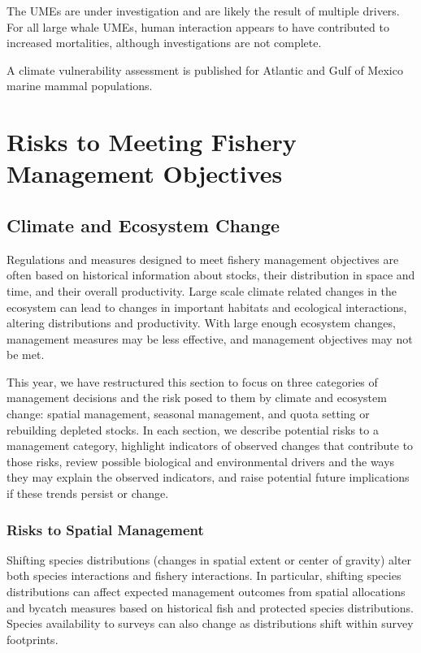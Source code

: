 \documentclass[
  10pt,
]{article}
\begin{document}
The UMEs are under investigation and are likely the result of multiple drivers. For all large whale UMEs, human interaction appears to have contributed to increased mortalities, although investigations are not complete.

A climate vulnerability assessment is published for Atlantic and Gulf of Mexico marine mammal populations.

\hypertarget{risks-to-meeting-fishery-management-objectives}{%
\section{Risks to Meeting Fishery Management Objectives}\label{risks-to-meeting-fishery-management-objectives}}

\hypertarget{climate-and-ecosystem-change}{%
\subsection{Climate and Ecosystem Change}\label{climate-and-ecosystem-change}}

Regulations and measures designed to meet fishery management objectives are often based on historical information about stocks, their distribution in space and time, and their overall productivity. Large scale climate related changes in the ecosystem can lead to changes in important habitats and ecological interactions, altering distributions and productivity. With large enough ecosystem changes, management measures may be less effective, and management objectives may not be met.

This year, we have restructured this section to focus on three categories of management decisions and the risk posed to them by climate and ecosystem change: spatial management, seasonal management, and quota setting or rebuilding depleted stocks. In each section, we describe potential risks to a management category, highlight indicators of observed changes that contribute to those risks, review possible biological and environmental drivers and the ways they may explain the observed indicators, and raise potential future implications if these trends persist or change.

\hypertarget{risks-to-spatial-management}{%
\subsubsection{Risks to Spatial Management}\label{risks-to-spatial-management}}

Shifting species distributions (changes in spatial extent or center of gravity) alter both species interactions and fishery interactions. In particular, shifting species distributions can affect expected management outcomes from spatial allocations and bycatch measures based on historical fish and protected species distributions. Species availability to surveys can also change as distributions shift within survey footprints.
\end{document}
